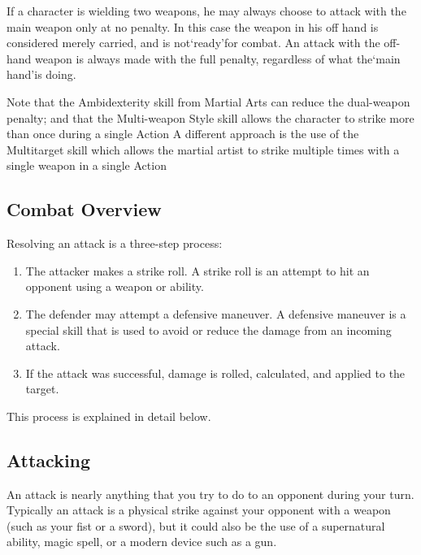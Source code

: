 \documentclass[twoside]{book}
\begin{document}
    {  
    If a character is wielding two weapons, he may always choose to attack with the main weapon only at no penalty. In this case the weapon in his off hand is considered merely carried, and is not`ready'for combat. An attack with the off-hand weapon is always made with the full penalty, regardless of what the`main hand'is doing.
    }
  
    {  
    Note that the Ambidexterity skill from Martial Arts can reduce the dual-weapon penalty; and that the Multi-weapon Style skill allows the character to strike more than once during a single Action A different approach is the use of the Multitarget skill which allows the martial artist to strike multiple times with a single weapon in a single Action
    }
  
    

\subsection{Combat Overview}
    
    {  
    Resolving an attack is a three-step process:
    }
  
\begin{enumerate}
      
  \item 
    {  
    The attacker makes a strike roll. A strike roll is an attempt to hit an opponent using a weapon or ability.
    }
  
  \item 
    {  
    The defender may attempt a defensive maneuver. A defensive maneuver is a special skill that is used to avoid or reduce the damage from an incoming attack.
    }
  
  \item 
    {  
    If the attack was successful, damage is rolled, calculated, and applied to the target.
    }
  
\end{enumerate}
  
    {  
    This process is explained in detail below.
    }
  
    

\subsection{Attacking}
    
    {  
    An attack is nearly anything that you try to do to an opponent during your turn. Typically an attack is a physical strike against your opponent with a weapon (such as your fist or a sword), but it could also be the use of a supernatural ability, magic spell, or a modern device such as a gun.
    }
  
\end{document}
